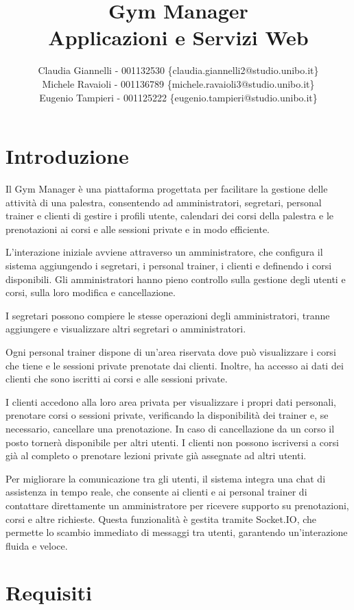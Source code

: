 \documentclass{report}
\title{
    Gym Manager \\
    \large Applicazioni e Servizi Web
}
\author{Claudia Giannelli - 001132530 \{claudia.giannelli2@studio.unibo.it\}\\
        Michele Ravaioli - 001136789 \{michele.ravaioli3@studio.unibo.it\}\\
        Eugenio Tampieri - 001125222 \{eugenio.tampieri@studio.unibo.it\}}
\begin{document}
\maketitle
\section{Introduzione}
\par Il Gym Manager è una piattaforma progettata per facilitare la gestione delle attività di una palestra, consentendo ad amministratori, segretari, personal trainer e clienti di gestire i profili utente, calendari dei corsi della palestra e le prenotazioni ai corsi e alle sessioni private e in modo efficiente.
\par L'interazione iniziale avviene attraverso un amministratore, che configura il sistema aggiungendo i segretari, i personal trainer, i clienti e definendo i corsi disponibili. Gli amministratori hanno pieno controllo sulla gestione degli utenti e corsi, sulla loro modifica e cancellazione.
\par I segretari possono compiere le stesse operazioni degli amministratori, tranne aggiungere e visualizzare altri segretari o amministratori.
\par Ogni personal trainer dispone di un'area riservata dove può visualizzare i corsi che tiene e le sessioni private prenotate dai clienti. Inoltre, ha accesso ai dati dei clienti che sono iscritti ai corsi e alle sessioni private.
\par I clienti accedono alla loro area privata per visualizzare i propri dati personali, prenotare corsi o sessioni private, verificando la disponibilità dei trainer e, se necessario, cancellare una prenotazione. In caso di cancellazione da un corso il posto tornerà disponibile per altri utenti. I clienti non possono iscriversi a corsi già al completo o prenotare lezioni private già assegnate ad altri utenti.
\par Per migliorare la comunicazione tra gli utenti, il sistema integra una chat di assistenza in tempo reale, che consente ai clienti e ai personal trainer di contattare direttamente un amministratore per ricevere supporto su prenotazioni, corsi e altre richieste. Questa funzionalità è gestita tramite Socket.IO, che permette lo scambio immediato di messaggi tra utenti, garantendo un'interazione fluida e veloce.
\section{Requisiti}
\end{document}
